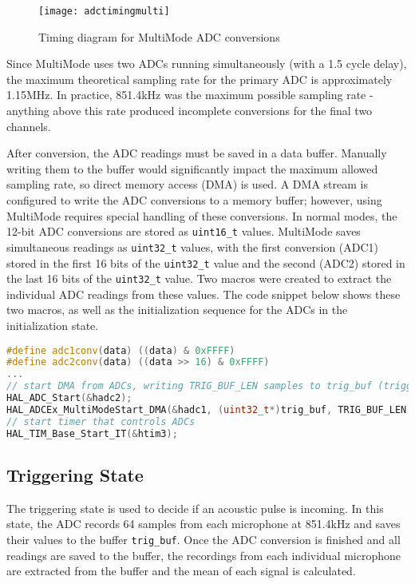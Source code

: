 \documentclass[12pt,a4paper]{report}
\begin{document}
\begin{figure}[htbp]
\centering
\texttt{[image: adctimingmulti]}
\caption{Timing diagram for MultiMode ADC conversions \cite{stmdatasheet}}
\label{fig:adctimingmulti}
\end{figure}

Since MultiMode uses two ADCs running simultaneously (with a 1.5 cycle delay), the maximum theoretical sampling rate for the primary ADC is approximately 1.15MHz. In practice, 851.4kHz was the maximum possible sampling rate - anything above this rate produced incomplete conversions for the final two channels.

After conversion, the ADC readings must be saved in a data buffer. Manually writing them to the buffer would significantly impact the maximum allowed sampling rate, so direct memory access (DMA) is used. A DMA stream is configured to write the ADC conversions to a memory buffer; however, using MultiMode requires special handling of these conversions. In normal modes, the 12-bit ADC conversions are stored as \verb|uint16_t| values. MultiMode saves simultaneous readings as \verb|uint32_t| values, with the first conversion (ADC1) stored in the first 16 bits of the \verb|uint32_t| value and the second (ADC2) stored in the last 16 bits of the \verb|uint32_t| value. Two macros were created to extract the individual ADC readings from these values. The code snippet below shows these two macros, as well as the initialization sequence for the ADCs in the initialization state.

\begin{lstlisting}[language=C++]
#define adc1conv(data) ((data) & 0xFFFF)
#define adc2conv(data) ((data >> 16) & 0xFFFF)
...
// start DMA from ADCs, writing TRIG_BUF_LEN samples to trig_buf (triggering state)
HAL_ADC_Start(&hadc2);
HAL_ADCEx_MultiModeStart_DMA(&hadc1, (uint32_t*)trig_buf, TRIG_BUF_LEN * NUM_MIC / 2);
// start timer that controls ADCs
HAL_TIM_Base_Start_IT(&htim3);
\end{lstlisting}

\subsection{Triggering State} \label{ssec:3s7s3}
The triggering state is used to decide if an acoustic pulse is incoming. In this state, the ADC records 64 samples from each microphone at 851.4kHz and saves their values to the buffer \verb|trig_buf|. Once the ADC conversion is finished and all readings are saved to the buffer, the recordings from each individual microphone are extracted from the buffer and the mean of each signal is calculated.
\end{document}
